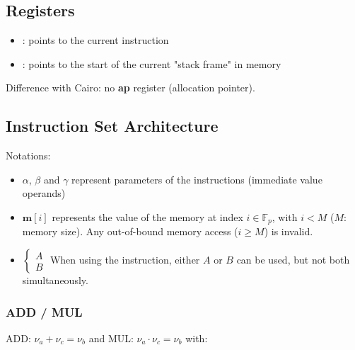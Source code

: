 \documentclass{article}
\theoremstyle{definition}
\newcommand{\Fp}{\mathbb F_p}
\begin{document}

\subsection{Registers}

\begin{itemize}
    \item {} : points to the current instruction
    \item {} : points to the start of the current "stack frame" in memory
\end{itemize}


Difference with Cairo: no \textbf{ap} register (allocation pointer).


\subsection{Instruction Set Architecture}

Notations:
\begin{itemize}
    \item $\alpha$, $\beta$ and $\gamma$ represent parameters of the instructions (immediate value operands)
    \item $\textbf{m}[i]$ represents the value of the memory at index $i \in \Fp$, with $i < M$ ($M$: memory size). Any out-of-bound memory access ($i \geq M$) is invalid.
    \item $\begin{cases} A \\ B \end{cases}$ When using the instruction, either $A$ or $B$ can be used, but not both simultaneously.
\end{itemize}


\subsubsection{ADD / MUL}

ADD: $\nu_a + \nu_c = \nu_b$ \hspace{3mm} and \hspace{3mm} MUL: $\nu_a \cdot \nu_c = \nu_b$ with: 
\end{document}

